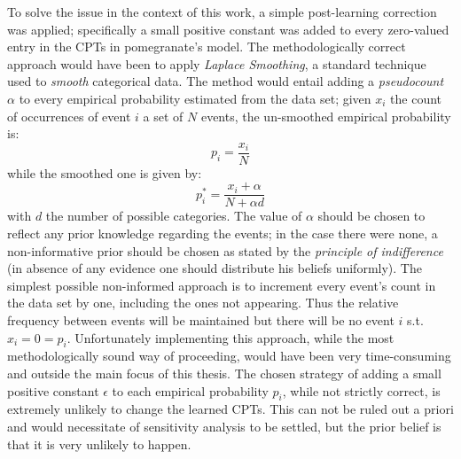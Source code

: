 To solve the issue in the context of this work, a simple post-learning correction was applied; specifically a small positive constant was added to every zero-valued entry in the CPTs in pomegranate's model.
The methodologically correct approach would have been to apply \textit{Laplace Smoothing}, a standard technique used to \textit{smooth} categorical data.
The method would entail adding a \textit{pseudocount} $\alpha$ to every empirical probability estimated from the data set; given $x_i$ the count of occurrences of event $i$ a set of $N$ events, the un-smoothed empirical probability is:
\begin{equation}
	p_i = \frac{x_{i}}{N}
\end{equation}
while the smoothed one is given by:
\begin{equation}
	p_i^*=\frac{x_{i}+\alpha}{N+\alpha d}
\end{equation}
with $d$ the number of possible categories.
The value of $\alpha$ should be chosen to reflect any prior knowledge regarding the events; in the case there were none, a non-informative prior should be chosen as stated by the \textit{principle of indifference} (in absence of any evidence one should distribute his beliefs uniformly).
The simplest possible non-informed approach is to increment every event's count in the data set by one, including the ones not appearing.
Thus the relative frequency between events will be maintained but there will be no event $i$ s.t. $x_i=0=p_i$.
Unfortunately implementing this approach, while the most methodologically sound way of proceeding, would have been very time-consuming and outside the main focus of this thesis.
The chosen strategy of adding a small positive constant $\epsilon$ to each empirical probability $p_i$, while not strictly correct, is extremely unlikely to change the learned CPTs.
This can not be ruled out a priori and would necessitate of sensitivity analysis to be settled, but the prior belief is that it is very unlikely to happen.

